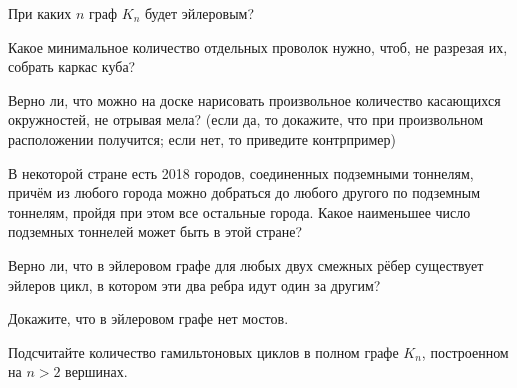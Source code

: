\begin{exersize}
	При каких $n$ граф $K_n$ будет эйлеровым?
\end{exersize}

\begin{exersize}
	Какое минимальное количество отдельных проволок нужно, чтоб, не разрезая их, собрать каркас куба?
\end{exersize}

\begin{exersize}
	Верно ли, что можно на доске нарисовать произвольное количество касающихся окружностей, не отрывая мела? (если да, то докажите, что при произвольном расположении получится; если нет, то приведите контрпример)
\end{exersize}

\begin{exersize}
	В некоторой стране есть 2018 городов, соединенных подземными тоннелям, причём из любого города можно добраться до любого другого по подземным тоннелям, пройдя при этом все остальные города. Какое наименьшее число подземных тоннелей может быть в этой стране?
\end{exersize}
	
\begin{exersize}
	Верно ли, что в эйлеровом графе для любых двух смежных рёбер существует эйлеров цикл, в котором эти два ребра идут один за другим?
\end{exersize}

\begin{exersize}
	Докажите, что в эйлеровом графе нет мостов.
\end{exersize}

\begin{exersize}
	Подсчитайте количество гамильтоновых циклов в полном графе $K_n$, построенном на $n > 2$ вершинах.
\end{exersize}